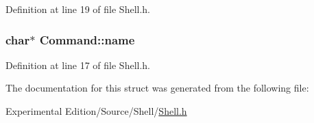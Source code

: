Definition at line 19 of file Shell.\+h.

\subsubsection[{\texorpdfstring{name}{name}}]{\setlength{\rightskip}{0pt plus 5cm}char$\ast$ Command\+::name}\hypertarget{structCommand_aac61810b8e87055d1648ec142086eb0e}{}\label{structCommand_aac61810b8e87055d1648ec142086eb0e}


Definition at line 17 of file Shell.\+h.



The documentation for this struct was generated from the following file\+:\begin{DoxyCompactItemize}
\item 
Experimental Edition/\+Source/\+Shell/\hyperlink{Shell_8h}{Shell.\+h}\end{DoxyCompactItemize}
